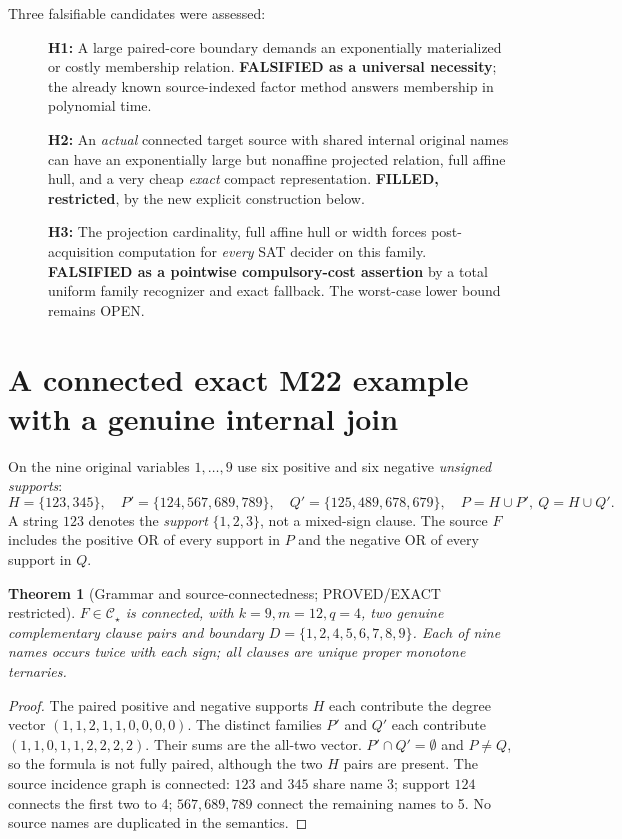 \documentclass[11pt]{article}
\newtheorem{theorem}{Theorem}
\newcommand{\CS}{\mathcal C_{\star}}
\begin{document}
Three falsifiable candidates were assessed:
\begin{description}
\item[] \textbf{H1:} A large paired-core boundary demands an exponentially materialized or costly membership relation. \textbf{FALSIFIED as a universal necessity}; the already known source-indexed factor method answers membership in polynomial time.
\item[] \textbf{H2:} An \emph{actual} connected target source with shared internal original names can have an exponentially large but nonaffine projected relation, full affine hull, and a very cheap \emph{exact} compact representation. \textbf{FILLED, restricted}, by the new explicit construction below.
\item[] \textbf{H3:} The projection cardinality, full affine hull or width forces post-acquisition computation for \emph{every} SAT decider on this family. \textbf{FALSIFIED as a pointwise compulsory-cost assertion} by a total uniform family recognizer and exact fallback. The worst-case lower bound remains OPEN.
\end{description}

\section{A connected exact M22 example with a genuine internal join}
On the nine original variables $1,\dots,9$ use six positive and six negative \emph{unsigned supports}:
\[
\boxed{
H=\{123,345\},\quad
P'=\{124,567,689,789\},\quad
Q'=\{125,489,678,679\},\quad
P=H\cup P',\ Q=H\cup Q'.
}
\]
A string $123$ denotes the \emph{support} $\{1,2,3\}$, not a mixed-sign clause. The source $F$ includes the positive OR of every support in $P$ and the negative OR of every support in $Q$.

\begin{theorem}[Grammar and source-connectedness; PROVED/EXACT restricted]
$F\in\CS$ is connected, with $k=9,m=12,q=4$, two genuine complementary clause pairs and boundary $D=\{1,2,4,5,6,7,8,9\}$. Each of nine names occurs twice with each sign; all clauses are unique proper monotone ternaries.
\end{theorem}
\begin{proof}
The paired positive and negative supports $H$ each contribute the degree vector $(1,1,2,1,1,0,0,0,0)$. The distinct families $P'$ and $Q'$ each contribute $(1,1,0,1,1,2,2,2,2)$. Their sums are the all-two vector. $P'\cap Q'=\emptyset$ and $P\ne Q$, so the formula is not fully paired, although the two $H$ pairs are present. The source incidence graph is connected: $123$ and $345$ share name 3; support $124$ connects the first two to 4; $567,689,789$ connect the remaining names to 5. No source names are duplicated in the semantics.
\end{proof}
\end{document}
